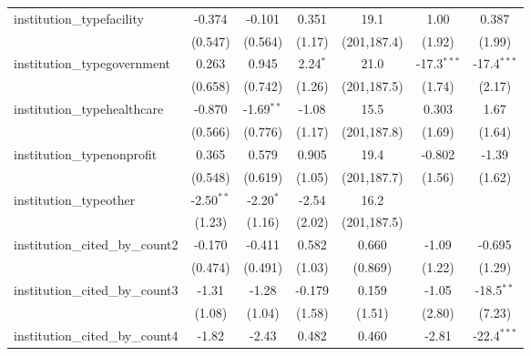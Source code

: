 \begin{tabular}{lcccccc}
   institution\_typefacility             & -0.374        & -0.101        & 0.351         & 19.1          & 1.00          & 0.387\\   
                                         & (0.547)       & (0.564)       & (1.17)        & (201,187.4)   & (1.92)        & (1.99)\\   
   institution\_typegovernment           & 0.263         & 0.945         & 2.24$^{*}$    & 21.0          & -17.3$^{***}$ & -17.4$^{***}$\\   
                                         & (0.658)       & (0.742)       & (1.26)        & (201,187.5)   & (1.74)        & (2.17)\\   
   institution\_typehealthcare           & -0.870        & -1.69$^{**}$  & -1.08         & 15.5          & 0.303         & 1.67\\   
                                         & (0.566)       & (0.776)       & (1.17)        & (201,187.8)   & (1.69)        & (1.64)\\   
   institution\_typenonprofit            & 0.365         & 0.579         & 0.905         & 19.4          & -0.802        & -1.39\\   
                                         & (0.548)       & (0.619)       & (1.05)        & (201,187.7)   & (1.56)        & (1.62)\\   
   institution\_typeother                & -2.50$^{**}$  & -2.20$^{*}$   & -2.54         & 16.2          &               &   \\   
                                         & (1.23)        & (1.16)        & (2.02)        & (201,187.5)   &               &   \\   
   institution\_cited\_by\_count2        & -0.170        & -0.411        & 0.582         & 0.660         & -1.09         & -0.695\\   
                                         & (0.474)       & (0.491)       & (1.03)        & (0.869)       & (1.22)        & (1.29)\\   
   institution\_cited\_by\_count3        & -1.31         & -1.28         & -0.179        & 0.159         & -1.05         & -18.5$^{**}$\\   
                                         & (1.08)        & (1.04)        & (1.58)        & (1.51)        & (2.80)        & (7.23)\\   
   institution\_cited\_by\_count4        & -1.82         & -2.43         & 0.482         & 0.460         & -2.81         & -22.4$^{***}$\\   

\end{tabular}
